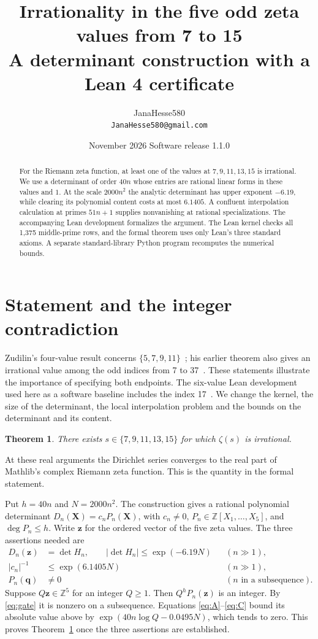 \documentclass[11pt]{article}
\title{Irrationality in the five odd zeta values from 7 to 15\\
\large A determinant construction with a Lean 4 certificate}
\author{JanaHesse580\\ \small\texttt{JanaHesse580@gmail.com}}
\date{November 2026 \qquad Software release 1.1.0}
\newtheorem{theorem}{Theorem}
\newcommand{\Z}{\mathbb Z}
\begin{document}
\maketitle
\begin{abstract}
For the Riemann zeta function, at least one of the values at
$7,9,11,13,15$ is irrational. We use a determinant of order $40n$ whose
entries are rational linear forms in these values and $1$. At the scale
$2000n^2$ the analytic determinant has upper exponent $-6.19$, while
clearing its polynomial content costs at most $6.1405$. A confluent
interpolation calculation at primes $51n+1$ supplies nonvanishing at
rational specializations. The accompanying Lean development formalizes
the argument. The Lean kernel checks all 1,375 middle-prime rows, and
the formal theorem uses only Lean's three standard axioms. A separate
standard-library Python program recomputes the numerical bounds.
\end{abstract}

\section{Statement and the integer contradiction}
Zudilin's four-value result concerns $\{5,7,9,11\}$~\cite{zud};
his earlier theorem also gives an irrational value among the odd indices
from 7 to 37~\cite{zud2}. These statements illustrate the importance
of specifying both endpoints. The six-value Lean development used here
as a software baseline includes the index 17~\cite{six}. We change the
kernel, the size of the determinant, the local interpolation problem and
the bounds on the determinant and its content.

\begin{theorem}\label{thm}
There exists $s\in\{7,9,11,13,15\}$ for which $\zeta(s)$ is irrational.
\end{theorem}
At these real arguments the Dirichlet series converges to the real part
of Mathlib's complex Riemann zeta function. This is the quantity in the
formal statement.

Put $h=40n$ and $N=2000n^2$. The construction gives a rational polynomial
determinant $D_n(\mathbf X)=c_n P_n(\mathbf X)$, with $c_n\ne0$,
$P_n\in\Z[X_1,\ldots,X_5]$, and $\deg P_n\le h$. Write $\mathbf z$ for
the ordered vector of the five zeta values. The three assertions needed are
\begin{align}
 D_n(\mathbf z)&=\det H_n,\qquad
 |\det H_n|\le \exp(-6.19N) && (n\gg1),\label{eq:A}\\
 |c_n|^{-1}&\le \exp(6.1405N) && (n\gg1),\label{eq:C}\\
 P_n(\mathbf q)&\ne0 &&(n\text{ in a subsequence}).\label{eq:gate}
\end{align}
Suppose $Q\mathbf z\in\Z^5$ for an integer $Q\ge1$. Then
$Q^h P_n(\mathbf z)$ is an integer. By \eqref{eq:gate} it is nonzero
on a subsequence. Equations \eqref{eq:A}--\eqref{eq:C} bound its absolute
value above by $\exp(40n\log Q-0.0495N)$, which tends to zero.
This proves Theorem~\ref{thm} once the three assertions are established.
\end{document}
